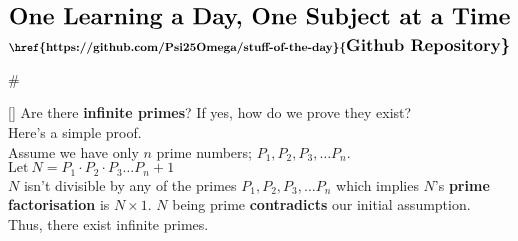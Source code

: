 \documentclass{article}
\begin{document}
\sffamily
\newenvironment{mathbox}[1][2]
{
  \vspace{1em}
  \begin{tcolorbox}[colback=yellow!50!white, colframe=yellow!60!red, title=#1]
  #
}
{
  \end{tcolorbox}
}
\newenvironment{phybox}[1][2]
{
  \vspace{1em}
  \begin{tcolorbox}[colback=blue!30!white, colframe=blue!80!white, title=#1]
  #
}
{
  \end{tcolorbox}
}
\newenvironment{chembox}[1][2]
{
  \vspace{1em}
  \begin{tcolorbox}[colback=red!30!white, colframe=red!90!white, title=#1]
  #
}
{
  \end{tcolorbox}
}
\newenvironment{biobox}[1][2]
{
  \vspace{1em}
  \begin{tcolorbox}[colback=green!30!white, colframe=green!90!black, title=#1]
  #
}
{
  \end{tcolorbox}
}
\sffamily
\begin{align*}
    \LARGE\textbf{One Learning a Day, One Subject at a Time}
\end{align*}
\begin{align*}
\textbf{\href{https://github.com/Psi25Omega/stuff-of-the-day}{\Large{Github Repository}}}
\end{align*}
\begin{mathbox}
[]
Are there \textbf{infinite primes}? If yes, how do we prove they exist?\\
Here's a simple proof.\\
Assume we have only $n$ prime numbers; $P_1, P_2, P_3, \dots P_n$.\\
$\text{Let}~N = P_1 \cdot P_2 \cdot P_3 \dots P_n + 1$\\
$N$ isn't divisible by any of the primes $P_1, P_2, P_3, \dots P_n$  which implies $N$'s \textbf{prime factorisation} is $N \times 1$. $N$ being prime \textbf{contradicts} our initial assumption.\\
Thus, there exist infinite primes.
\end{mathbox}
\end{document}
